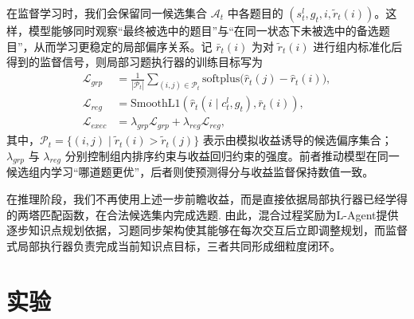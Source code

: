 \documentclass[11pt,a4paper]{article}
\begin{document}
在监督学习时，我们会保留同一候选集合 $\mathcal{A}_t$ 中各题目的 $(s_t^l,g_t,i,\tilde{r}_t(i))$。这样，模型能够同时观察“最终被选中的题目”与“在同一状态下未被选中的备选题目”，从而学习更稳定的局部偏序关系。记 $\bar{r}_t(i)$ 为对 $\tilde{r}_t(i)$ 进行组内标准化后得到的监督信号，则局部习题执行器的训练目标写为
\begin{equation}
\begin{aligned}
\mathcal{L}_{grp}
&=
\frac{1}{|\mathcal{P}_t|}
\sum_{(i,j)\in\mathcal{P}_t}
\mathrm{softplus}\!\big(
\hat{r}_{t}(j)-\hat{r}_{t}(i)
\big),\\
\mathcal{L}_{reg}
&=
\mathrm{SmoothL1}\!\left(
\hat{r}_{t}(i\mid c_t^l,g_t),\bar{r}_t(i)
\right),\\
\mathcal{L}_{exec}
&=
\lambda_{grp} \mathcal{L}_{grp}
+
\lambda_{reg} \mathcal{L}_{reg},
\end{aligned}
\end{equation}
其中，$\mathcal{P}_t=\{(i,j)\mid \tilde{r}_t(i)>\tilde{r}_t(j)\}$ 表示由模拟收益诱导的候选偏序集合；$\lambda_{grp}$ 与 $\lambda_{reg}$ 分别控制组内排序约束与收益回归约束的强度。前者推动模型在同一候选组内学习“哪道题更优”，后者则使预测得分与收益监督保持数值一致。

在推理阶段，我们不再使用上述一步前瞻收益，而是直接依据局部执行器已经学得的两塔匹配函数，在合法候选集内完成选题.
由此，混合过程奖励为L-Agent提供逐步知识点规划依据，习题同步架构使其能够在每次交互后立即调整规划，而监督式局部执行器负责完成当前知识点目标，三者共同形成细粒度闭环。
\section{实验}
\end{document}
